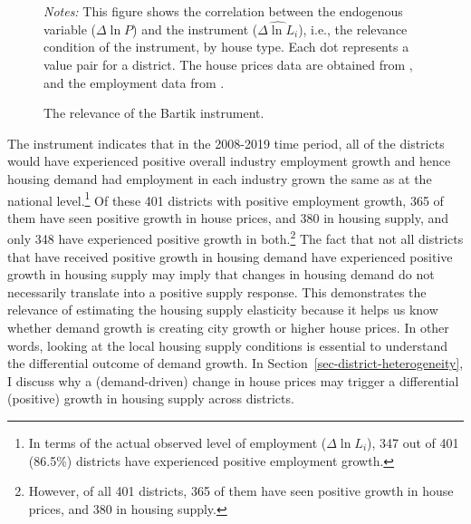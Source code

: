 \documentclass[
  12pt,
]{article}
\begin{document}
\begin{figure}
\begin{minipage}{0.50\linewidth}
{}


\end{minipage}%

\caption{\label{fig-first-stage}The relevance of the Bartik
instrument.}
\begin{minipage}{0.975\textwidth}
\small
\emph{Notes:} This figure shows
the correlation between the endogenous variable (\(\Delta \ln P\)) and
the instrument (\(\widehat{\Delta \ln L_i}\)), i.e., the relevance
condition of the instrument, by house type. Each dot represents a value
pair for a district. The house prices data are obtained from
\citet{rwi_redhk_2020}, and the employment data from
\citet{atlasde_2022}.
\end{minipage}


\end{figure}%

The instrument indicates that in the 2008-2019 time period, all of the
districts would have experienced positive overall industry employment
growth and hence housing demand had employment in each industry grown
the same as at the national level.\footnote{In terms of the actual
  observed level of employment (\(\Delta\ln{ L_i}\)), 347 out of 401
  (86.5\%) districts have experienced positive employment growth.} Of
these 401 districts with positive employment growth, 365 of them have
seen positive growth in house prices, and 380 in housing supply, and
only 348 have experienced positive growth in both.\footnote{However, of
  all 401 districts, 365 of them have seen positive growth in house
  prices, and 380 in housing supply.} The fact that not all districts
that have received positive growth in housing demand have experienced
positive growth in housing supply may imply that changes in housing
demand do not necessarily translate into a positive supply response.
This demonstrates the relevance of estimating the housing supply
elasticity because it helps us know whether demand growth is creating
city growth or higher house prices. In other words, looking at the local
housing supply conditions is essential to understand the differential
outcome of demand growth. In Section~\ref{sec-district-heterogeneity}, I
discuss why a (demand-driven) change in house prices may trigger a
differential (positive) growth in housing supply across districts.
\end{document}
